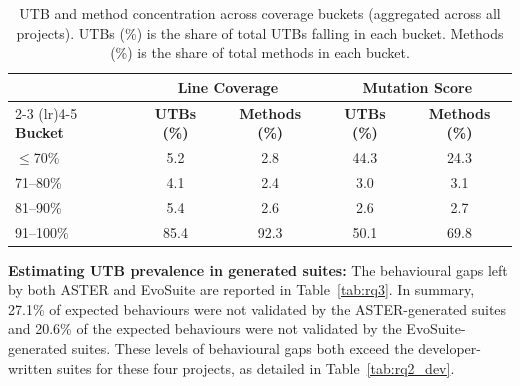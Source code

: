 \begin{table}[h]
\centering
\caption{UTB and method concentration across coverage buckets (aggregated across 
all projects). UTBs (\%) is the share of total UTBs falling in each bucket. 
Methods (\%) is the share of total methods in each bucket.}
\label{tab:rq4}
\small
\setlength{\tabcolsep}{3.5pt}
\begin{tabular}{l cc cc}
\toprule
& \multicolumn{2}{c}{\textbf{Line Coverage}} 
& \multicolumn{2}{c}{\textbf{Mutation Score}} \\
\cmidrule(lr){2-3} \cmidrule(lr){4-5}
\textbf{Bucket} 
& \textbf{UTBs (\%)} & \textbf{Methods (\%)} 
& \textbf{UTBs (\%)} & \textbf{Methods (\%)} \\
\midrule
$\leq$70\%  & 5.2  & 2.8  & 44.3 & 24.3 \\
71--80\%    & 4.1  & 2.4  & 3.0  & 3.1  \\
81--90\%    & 5.4  & 2.6  & 2.6  & 2.7  \\
91--100\%   & 85.4 & 92.3 & 50.1 & 69.8 \\
\bottomrule
\end{tabular}
\end{table}


\smallskip
\noindent\textbf{Estimating UTB prevalence in generated suites:}
%
The behavioural gaps left by both ASTER and EvoSuite are reported in Table~\ref{tab:rq3}.
In summary, 27.1\% of expected behaviours were not validated by the ASTER-generated suites and 20.6\% of the expected behaviours were not validated by the EvoSuite-generated suites.
These levels of behavioural gaps both exceed the developer-written suites for these four projects, as detailed in Table~\ref{tab:rq2_dev}.

